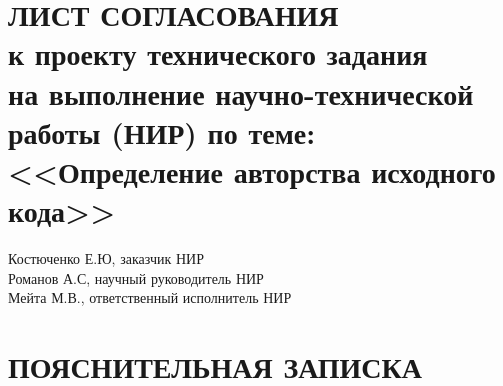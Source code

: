 \titleformat{\section}{\centering\normalfont\normalsize}{\thesection}{1.0em}{}

\newpage
\section*{
ЛИСТ СОГЛАСОВАНИЯ\\
к проекту технического задания\\
на выполнение научно-технической работы (НИР) по теме:\\
<<Определение авторства исходного кода>>}


\begin{flushleft}
\underline{\hspace{4cm}} Костюченко Е.Ю, заказчик НИР\\
\underline{\hspace{4cm}} Романов А.С, научный руководитель НИР\\
\underline{\hspace{4cm}} Мейта М.В., ответственный исполнитель НИР\\
\end{flushleft}

\newpage
\section*{ПОЯСНИТЕЛЬНАЯ ЗАПИСКА}

